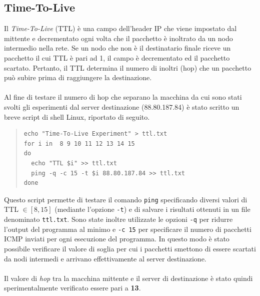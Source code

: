 \documentclass[a4paper,10pt]{article}
\begin{document}
\subsection{Time-To-Live}
Il \textit{Time-To-Live} (TTL) è una campo dell'header IP che viene impostato dal mittente e decrementato ogni volta che il pacchetto è inoltrato da un nodo intermedio nella rete. Se un nodo che non è il destinatario finale riceve un pacchetto il cui TTL è pari ad 1, il campo è decrementato ed il pacchetto scartato. Pertanto, il TTL determina il numero di inoltri (hop) che un pacchetto può subire prima di raggiungere la destinazione.\\\\
Al fine di testare il numero di hop che separano la macchina da cui sono stati svolti gli esperimenti dal server destinazione (88.80.187.84) è stato scritto un breve script di shell Linux, riportato di seguito.
\small
\begin{quote}
\begin{verbatim}
echo "Time-To-Live Experiment" > ttl.txt
for i in  8 9 10 11 12 13 14 15 
do
  echo "TTL $i" >> ttl.txt
  ping -q -c 15 -t $i 88.80.187.84 >> ttl.txt
done
\end{verbatim}
\end{quote}
\normalsize
Questo script permette di testare il comando \texttt{ping} specificando diversi valori di TTL $\in[8, 15]$ (mediante l'opzione \texttt{-t}) e di salvare i risultati ottenuti in un file denominato \texttt{ttl.txt}. Sono state inoltre utilizzate le opzioni \texttt{-q} per ridurre l'output del programma al minimo e \texttt{-c 15} per specificare il numero di pacchetti ICMP inviati per ogni esecuzione del programma. In questo modo è stato possibile verificare il valore di soglia per cui i pacchetti smettono di essere scartati da nodi intermedi e arrivano effettivamente al server destinazione. \\\\
Il valore di \textit{hop} tra la macchina mittente e il server di destinazione è stato quindi sperimentalmente verificato essere pari a \textbf{13}.

\newpage
\end{document}
